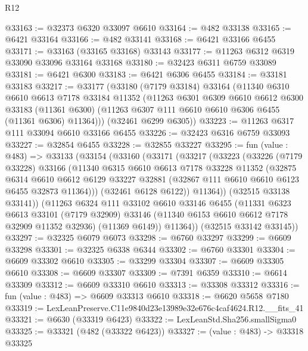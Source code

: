 \begin{lexlean}{R12}
\begin{coremodule}
@33163 := @32373 @6320 @33097 @6610
@33164 := @482 @33138
@33165 := @6421 @33164
@33166 := @482 @33141
@33168 := @6421 @33166 @6455
@33171 := @33163 (@33165 @33168) @33143
@33177 := @11263 @6312 @6319 @33090 @33096 @33164 @33168
@33180 := @32423 @6311 @6759 @33089
@33181 := @6421 @6300
@33183 := @6421 @6306 @6455
@33184 := @33181 @33183
@33217 := @33177
    (@33180
      (@7179 @33184)
      @33164
      (@11340
        @6310
        @6610
        @6613
        @7178
        @33184
        @11352
        (@11263
          @6301
          @6309
          @6610
          @6612
          @6300
          @33183
          (@11361 @6300)
          (@11263 @6307 @111 @6610 @6610 @6306 @6455 (@11361 @6306) @11364)))
      (@32461 @6299 @6305))
@33223 := @11263 @6317 @111 @33094 @6610 @33166 @6455
@33226 := @32423 @6316 @6759 @33093
@33227 := @32854 @6455
@33228 := @32855 @33227
@33295 := fun (value : @483) =>
  @33133
    (@33154
      (@33160
        (@33171
          (@33217
            (@33223
              (@33226
                (@7179 @33228)
                @33166
                (@11340
                  @6315
                  @6610
                  @6613
                  @7178
                  @33228
                  @11352
                  (@32875
                    @6314
                    @6610
                    @6612
                    @6129
                    @33227
                    @32881
                    (@32867 @111 @6610 @6610 @6123 @6455 @32873 @11364)))
                (@32461 @6128 @6122))
              @11364))
          (@32515 @33138 @33141))
        (@11263
          @6324
          @111
          @33102
          @6610
          @33146
          @6455
          (@11331
            @6323
            @6613
            @33101
            (@7179 @32909)
            @33146
            (@11340 @6153 @6610 @6612 @7178 @32909 @11352 @32936)
            (@11369 @6149))
          @11364))
      (@32515 @33142 @33145))
@33297 := @32325 @6079 @6073
@33298 := @6760 @33297
@33299 := @6609 @33298
@33301 := @32325 @6338 @6344
@33302 := @6760 @33301
@33304 := @6609 @33302 @6610
@33305 := @33299 @33304
@33307 := @6609 @33305 @6610
@33308 := @6609 @33307
@33309 := @7391 @6359
@33310 := @6614 @33309
@33312 := @6609 @33310 @6610
@33313 := @33308 @33312
@33316 := fun (value : @483) => @6609 @33313 @6610
@33318 := @6620 @5658 @7180
@33319 := LexLeanPreserve.C11e9840d23e13989e32e676c4caf4624.R12.__fits_41
@33321 := @6630 (@33319 @6423)
@33322 := LexLeanStd.Sha256.smallSigma0
@33325 := @33321 (@482 (@33322 @6423))
@33327 := (value : @483) -> @33318 @33325

\end{coremodule}
\end{lexlean}
